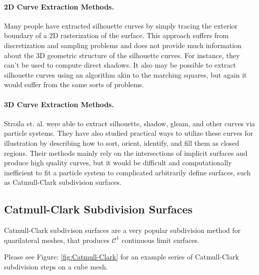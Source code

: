 \documentclass[12pt, letterpaper]{article}
\begin{document}
	\paragraph{2D Curve Extraction Methods.}

		Many people have extracted silhouette curves by simply tracing the exterior boundary of a 2D rasterization of the surface. This approach suffers from 
		discretization and sampling problems and does not provide much information about the 3D geometric structure of the silhouette curves.
		For instance, they can't be used to compute direct shadows.
		It also may be possible to extract silhouette curves using an algorithm akin to the marching squares, but again it would suffer from the same sorts of problems.
	
	\paragraph{3D Curve Extraction Methods.}

	Stroila et. al. were able to extract silhouette, shadow, gleam, and other curves via particle systems. They have also studied practical ways to utilize these curves
	for illustration by describing how to sort, orient, identify, and fill them as closed regions. \cite{SEH08}
	Their methods mainly rely on the intersections of implicit surfaces and produce high quality curves, but it would be difficult and computationally
	inefficient to fit a particle system to complicated arbitrarily define surfaces, such as Catmull-Clark subdivision surfaces.
	
	\subsection{Catmull-Clark Subdivision Surfaces}

		Catmull-Clark subdivison surfaces are a very popular subdivision method for quarilateral meshes, that produces $\mathcal{C}^{1}$ continuous limit surfaces.
		
		Please see Figure: \ref{fig:Catmull-Clark} for an example series of Catmull-Clark subdivision steps on a cube mesh.
\end{document}
